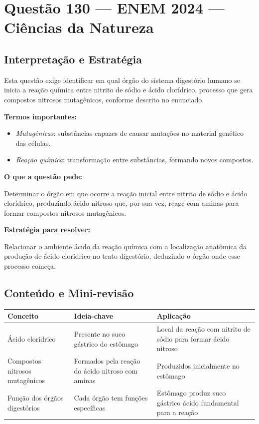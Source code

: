 \documentclass{article}
\begin{document}
\section*{Questão 130 — ENEM 2024 — Ciências da Natureza}

\subsection*{Interpretação e Estratégia}
Esta questão exige identificar em qual órgão do sistema digestório humano se inicia a reação química entre nitrito de sódio e ácido clorídrico, processo que gera compostos nitrosos mutagênicos, conforme descrito no enunciado.

\textbf{Termos importantes:}
\begin{itemize}
  \item \textit{Mutagênicas}: substâncias capazes de causar mutações no material genético das células.
  \item \textit{Reação química}: transformação entre substâncias, formando novos compostos.
\end{itemize}

\textbf{O que a questão pede:}

Determinar o órgão em que ocorre a reação inicial entre nitrito de sódio e ácido clorídrico, produzindo ácido nitroso que, por sua vez, reage com aminas para formar compostos nitrosos mutagênicos.

\textbf{Estratégia para resolver:}

Relacionar o ambiente ácido da reação química com a localização anatômica da produção de ácido clorídrico no trato digestório, deduzindo o órgão onde esse processo começa.

\subsection*{Conteúdo e Mini-revisão}
\begin{tabular}{|p{4cm}|p{6cm}|p{5cm}|}
\hline
\textbf{Conceito} & \textbf{Ideia-chave} & \textbf{Aplicação} \\ \hline
Ácido clorídrico & Presente no suco gástrico do estômago & Local da reação com nitrito de sódio para formar ácido nitroso \\ \hline
Compostos nitrosos mutagênicos & Formados pela reação do ácido nitroso com aminas & Produzidos inicialmente no estômago \\ \hline
Função dos órgãos digestórios & Cada órgão tem funções específicas & Estômago produz suco gástrico ácido fundamental para a reação \\ \hline
\end{tabular}
\end{document}
